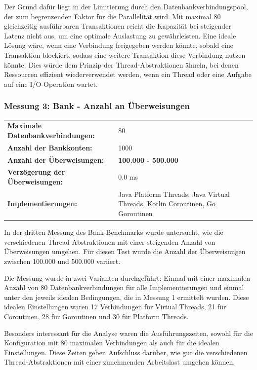 \documentclass[fontsize=12pt,paper=a4,twoside=semi,parskip=half-,headsepline,headinclude]{scrreprt}
\begin{document}
Der Grund dafür liegt in der Limitierung durch den Datenbankverbindungspool, der zum begrenzenden Faktor für die Parallelität wird. Mit maximal 80 gleichzeitig ausführbaren Transaktionen reicht die Kapazität bei steigender Latenz nicht aus, um eine optimale Auslastung zu gewährleisten. Eine ideale Lösung wäre, wenn eine Verbindung freigegeben werden könnte, sobald eine Transaktion blockiert, sodass eine weitere Transaktion diese Verbindung nutzen könnte. Dies würde dem Prinzip der Thread-Abstraktionen ähneln, bei denen Ressourcen effizient wiederverwendet werden, wenn ein Thread oder eine Aufgabe auf eine I/O-Operation wartet.

\subsubsection{Messung 3: Bank - Anzahl an Überweisungen}

\begin{tabularx}{\textwidth}{@{}lX@{}}
	\textbf{Maximale Datenbankverbindungen:} & 80 \\
	\textbf{Anzahl der Bankkonten:} & 1000 \\
	\textbf{Anzahl der Überweisungen:} & \textbf{100.000 - 500.000} \\
	\textbf{Verzögerung der Überweisungen:} & 0.0 ms \\
	\textbf{Implementierungen:} & Java Platform Threads, Java Virtual Threads, Kotlin Coroutinen, Go Goroutinen
\end{tabularx}

In der dritten Messung des Bank-Benchmarks wurde untersucht, wie die verschiedenen Thread-Abstraktionen mit einer steigenden Anzahl von Überweisungen umgehen. Für diesen Test wurde die Anzahl der Überweisungen zwischen 100.000 und 500.000 variiert.

Die Messung wurde in zwei Varianten durchgeführt: Einmal mit einer maximalen Anzahl von 80 Datenbankverbindungen für alle Implementierungen und einmal unter den jeweils idealen Bedingungen, die in Messung 1 ermittelt wurden. Diese idealen Einstellungen waren 17 Verbindungen für Virtual Threads, 21 für Coroutinen, 28 für Goroutinen und 30 für Platform Threads.

Besonders interessant für die Analyse waren die Ausführungszeiten, sowohl für die Konfiguration mit 80 maximalen Verbindungen als auch für die idealen Einstellungen. Diese Zeiten geben Aufschluss darüber, wie gut die verschiedenen Thread-Abstraktionen mit einer zunehmenden Arbeitslast umgehen können.
\end{document}
